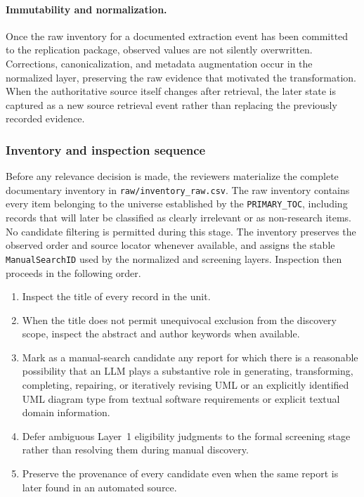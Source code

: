 \paragraph{Immutability and normalization.}
Once the raw inventory for a documented extraction event has been committed to the replication
package, observed values are not silently overwritten. Corrections, canonicalization, and metadata
augmentation occur in the normalized layer, preserving the raw evidence that motivated the
transformation. When the authoritative source itself changes after retrieval, the later state is
captured as a new source retrieval event rather than replacing the previously recorded evidence.

\subsubsection{Inventory and inspection sequence}

Before any relevance decision is made, the reviewers materialize the complete documentary
inventory in \texttt{raw/inventory\_raw.csv}. The raw inventory contains every item belonging to
the universe established by the \texttt{PRIMARY\_TOC}, including records that will later be
classified as clearly irrelevant or as non-research items. No candidate filtering is permitted
during this stage. The inventory preserves the observed order and source locator whenever
available, and assigns the stable \texttt{ManualSearchID} used by the normalized and screening
layers. Inspection then proceeds in the following order.

\begin{enumerate}[label=\arabic*)]
    \item Inspect the title of every record in the unit.
    \item When the title does not permit unequivocal exclusion from the discovery scope, inspect the
    abstract and author keywords when available.
    \item Mark as a manual-search candidate any report for which there is a reasonable possibility
    that an LLM plays a substantive role in generating, transforming, completing, repairing, or
    iteratively revising UML or an explicitly identified UML diagram type from textual software
    requirements or explicit textual domain information.
    \item Defer ambiguous Layer~1 eligibility judgments to the formal screening stage rather than
    resolving them during manual discovery.
    \item Preserve the provenance of every candidate even when the same report is later found in an
    automated source.
\end{enumerate}

